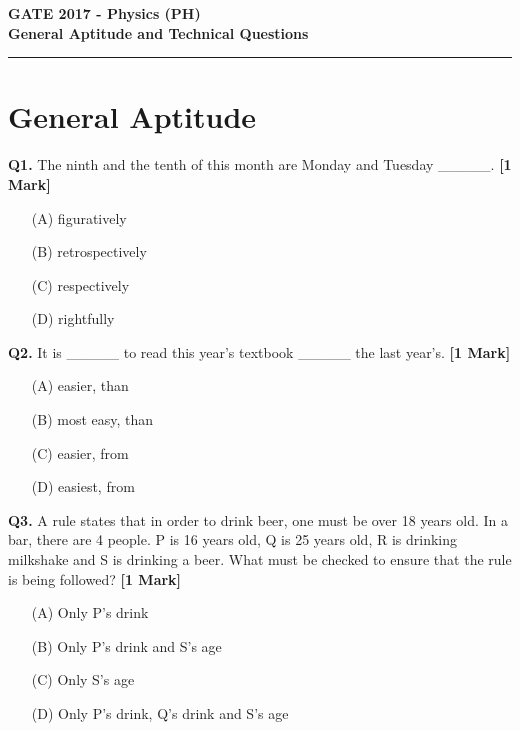 \documentclass[11pt]{article}
\newcommand{\questiona}[2]{
    \noindent\textbf{Q#2.} #1 \hfill \textbf{[1 Mark]}
}
\begin{document}
\begin{center}
    \Large\textbf{GATE 2017 - Physics (PH)} \\
    \large\textbf{General Aptitude and Technical Questions} \\
    \rule{\textwidth}{0.5pt} %
\end{center}

\vspace{0.5cm}

\section*{General Aptitude}

\questiona{The ninth and the tenth of this month are Monday and Tuesday \_\_\_\_\_.}{1}
\begin{enumerate}
    \item[(A)] figuratively
    \item[(B)] retrospectively
    \item[(C)] respectively
    \item[(D)] rightfully
\end{enumerate}
\vspace{0.5cm}

\questiona{It is \_\_\_\_\_ to read this year's textbook \_\_\_\_\_ the last year's.}{2}
\begin{enumerate}
    \item[(A)] easier, than
    \item[(B)] most easy, than
    \item[(C)] easier, from
    \item[(D)] easiest, from
\end{enumerate}
\vspace{0.5cm}

\questiona{A rule states that in order to drink beer, one must be over 18 years old. In a bar, there are 4 people. P is 16 years old, Q is 25 years old, R is drinking milkshake and S is drinking a beer. What must be checked to ensure that the rule is being followed?}{3}
\begin{enumerate}
    \item[(A)] Only P's drink
    \item[(B)] Only P's drink and S's age
    \item[(C)] Only S's age
    \item[(D)] Only P's drink, Q's drink and S's age
\end{enumerate}
\vspace{0.5cm}
\end{document}
